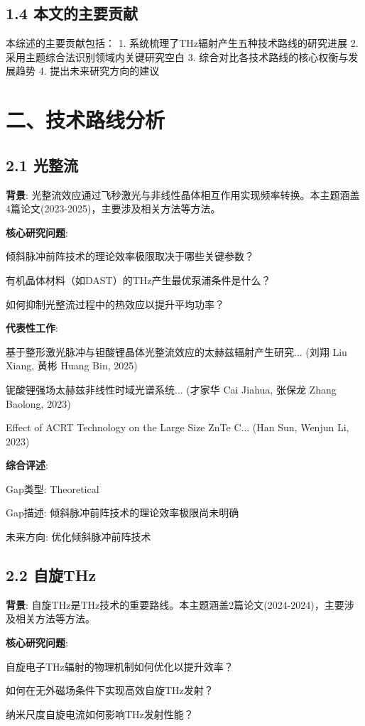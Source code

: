 \documentclass[12pt]{article}
\begin{document}
\subsection{1.4 本文的主要贡献}

本综述的主要贡献包括：
1. 系统梳理了THz辐射产生五种技术路线的研究进展
2. 采用主题综合法识别领域内关键研究空白
3. 综合对比各技术路线的核心权衡与发展趋势
4. 提出未来研究方向的建议


\section{二、技术路线分析}


\subsection{2.1 光整流}

\textbf{背景}: 光整流效应通过飞秒激光与非线性晶体相互作用实现频率转换。本主题涵盖4篇论文(2023-2025)，主要涉及相关方法等方法。

\textbf{核心研究问题}:
\item 倾斜脉冲前阵技术的理论效率极限取决于哪些关键参数？
\item 有机晶体材料（如DAST）的THz产生最优泵浦条件是什么？
\item 如何抑制光整流过程中的热效应以提升平均功率？

\textbf{代表性工作}:
\item [1] 基于整形激光脉冲与钽酸锂晶体光整流效应的太赫兹辐射产生研究... (刘翔 Liu Xiang, 黄彬 Huang Bin, 2025)
\item [2] 铌酸锂强场太赫兹非线性时域光谱系统... (才家华 Cai Jiahua, 张保龙 Zhang Baolong, 2023)
\item [3] Effect of ACRT Technology on the Large Size ZnTe C... (Han Sun, Wenjun Li, 2023)

\textbf{综合评述}:
\item Gap类型: Theoretical
\item Gap描述: 倾斜脉冲前阵技术的理论效率极限尚未明确
\item 未来方向: 优化倾斜脉冲前阵技术


\subsection{2.2 自旋THz}

\textbf{背景}: 自旋THz是THz技术的重要路线。本主题涵盖2篇论文(2024-2024)，主要涉及相关方法等方法。

\textbf{核心研究问题}:
\item 自旋电子THz辐射的物理机制如何优化以提升效率？
\item 如何在无外磁场条件下实现高效自旋THz发射？
\item 纳米尺度自旋电流如何影响THz发射性能？
\end{document}
